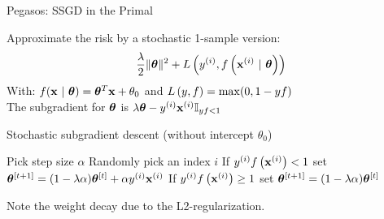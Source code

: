 \documentclass[11pt,compress,t,notes=noshow, xcolor=table]{beamer}
\begin{document}






\begin{vbframe}{Pegasos: SSGD in the Primal}

Approximate the risk by a stochastic 1-sample version: 
\vspace{-0.3cm}
$$ \frac{\lambda}{2} \|\bm{\theta}\|^2 + L\left(y^{(i)}, f\left(\mathbf{x}^{(i)} ~|~ \bm{\theta}\right)\right) $$
With: $f(\mathbf{x} ~|~ \bm{\theta}) = \bm{\theta}^T \mathbf{x} + \theta_0$ and $L\left(y, f\right) = \max(0, 1 -  y f)$\\
The subgradient for $\bm{\theta}$ is $\lambda \bm{\theta} - y^{(i)} \mathbf{x}^{(i)} \mathbb{I}_{yf < 1}$

\vspace{-0.1cm}

\begin{algorithm}[H]
  \caption*{Stochastic subgradient descent (without intercept $\theta_0$)}
  \begin{algorithmic}[1]
      \State Pick step size $\alpha$
      \State Randomly pick an index $i$
      \State If $y^{(i)} f\left(\mathbf{x}^{(i)}\right) < 1$ set $\bm{\theta}^{[t +1]} = (1 - \lambda \alpha) \bm{\theta}^{[t]} + \alpha y^{(i)} \mathbf{x}^{(i)}$ 
      \State If $y^{(i)} f\left(\mathbf{x}^{(i)}\right) \geq 1$ set $\bm{\theta}^{[t +1]} = (1 - \lambda \alpha) \bm{\theta}^{[t]}$ 
      \EndFor
  \end{algorithmic}
\end{algorithm}
\vspace{-0.2cm}
Note the weight decay due to the L2-regularization.
\end{vbframe}
\end{document}
